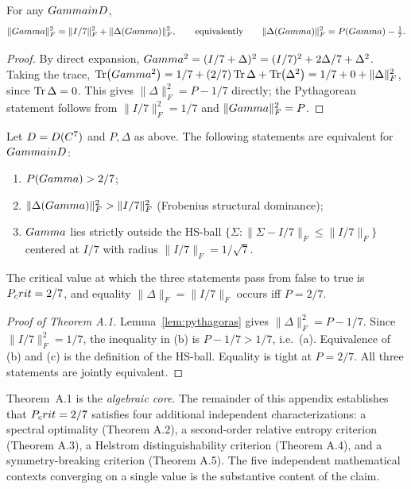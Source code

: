 \begin{lemma}\label{lem:pythagoras}
For any $Gamma in D$,
\[
  \|Gamma\|_F^2 = \|I/7\|_F^2 + \|\Delta(Gamma)\|_F^2,
  \qquad
  \text{equivalently}\qquad
  \|\Delta(Gamma)\|_F^2 = P(Gamma) - \tfrac{1}{7}.
\]
\end{lemma}

\begin{proof}
By direct expansion,
$Gamma^2 = (I/7 + \Delta)^2 = (I/7)^2 + 2\Delta/7 + \Delta^2$.
Taking the trace, $\Tr(Gamma^2) = 1/7 + (2/7)\Tr\Delta + \Tr(\Delta^2)
= 1/7 + 0 + \|\Delta\|_F^2$, since $\Tr\Delta = 0$.
This gives $\|\Delta\|_F^2 = P - 1/7$ directly; the Pythagorean statement
follows from $\|I/7\|_F^2 = 1/7$ and $\|Gamma\|_F^2 = P$.
\end{proof}

\begin{theorembox}[{Theorem~A.1 (Critical purity, N=7)}]
Let $D = D(C^7)$ and $P, \Delta$ as above. The following
statements are equivalent for $Gamma in D$:
\begin{enumerate}[leftmargin=2em,label=(\alph*)]
  \item $P(Gamma) > 2/7$;
  \item $\|\Delta(Gamma)\|_F^2 > \|I/7\|_F^2$ \hfill(Frobenius structural dominance);
  \item $Gamma$ lies strictly outside the HS-ball $\{\Sigma : \|\Sigma - I/7\|_F \leq \|I/7\|_F\}$
        centered at $I/7$ with radius $\|I/7\|_F = 1/\sqrt 7$.
\end{enumerate}
The critical value at which the three statements pass from false to true is
$P_crit = 2/7$, and equality $\|\Delta\|_F = \|I/7\|_F$ occurs iff $P = 2/7$.
\end{theorembox}

\begin{proof}[Proof of Theorem A.1]
Lemma~\ref{lem:pythagoras} gives $\|\Delta\|_F^2 = P - 1/7$. Since
$\|I/7\|_F^2 = 1/7$, the inequality in (b) is
$P - 1/7 > 1/7$, i.e.\ (a). Equivalence of (b) and (c) is the definition of
the HS-ball. Equality is tight at $P = 2/7$. All three statements are jointly
equivalent.
\end{proof}

Theorem~A.1 is the \emph{algebraic core}. The remainder of this appendix
establishes that $P_crit = 2/7$ satisfies four additional independent
characterizations: a spectral optimality (Theorem A.2), a
second-order relative entropy criterion (Theorem A.3), a Helstrom
distinguishability criterion (Theorem A.4), and a symmetry-breaking
criterion (Theorem A.5). The five independent mathematical contexts
converging on a single value is the substantive content of the claim.

